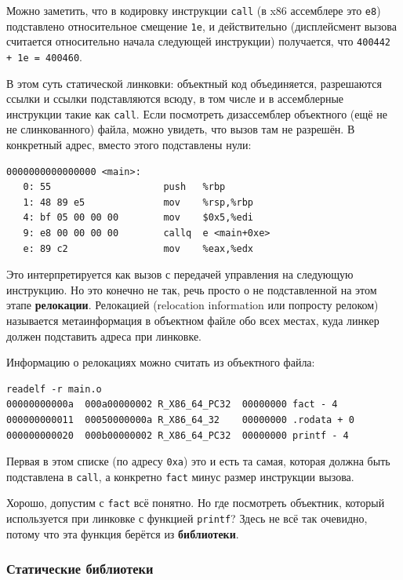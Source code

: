 \documentclass[a4paper,12pt,oneside]{article}
\begin{document}
Можно заметить, что в кодировку инструкции \lstinline!сall! (в x86 ассемблере это \lstinline!e8!) подставлено относительное смещение \lstinline!1e!, и действительно (дисплейсмент вызова считается относительно начала следующей инструкции) получается, что \lstinline!400442 + 1e = 400460!.

В этом суть статической линковки: объектный код объединяется, разрешаются ссылки и ссылки подставляются всюду, в том числе и в ассемблерные инструкции такие как \lstinline!call!. Если посмотреть дизассемблер объектного (ещё не не слинкованного) файла, можно увидеть, что вызов там не разрешён. В конкретный адрес, вместо этого подставлены нули:

\begin{verbatim}
0000000000000000 <main>:
   0: 55                    push   %rbp
   1: 48 89 e5              mov    %rsp,%rbp
   4: bf 05 00 00 00        mov    $0x5,%edi
   9: e8 00 00 00 00        callq  e <main+0xe>
   e: 89 c2                 mov    %eax,%edx
\end{verbatim}

Это интерпретируется как вызов с передачей управления на следующую инструкцию. Но это конечно не так, речь просто о не подставленной на этом этапе \textbf{релокации}. Релокацией (relocation information или попросту релоком) называется метаинформация в объектном файле обо всех местах, куда линкер должен подставить адреса при линковке.

Информацию о релокациях можно считать из объектного файла:

\begin{verbatim}
readelf -r main.o
00000000000a  000a00000002 R_X86_64_PC32  00000000 fact - 4
000000000011  00050000000a R_X86_64_32    00000000 .rodata + 0
000000000020  000b00000002 R_X86_64_PC32  00000000 printf - 4
\end{verbatim}

Первая в этом списке (по адресу \lstinline!0xa!) это и есть та самая, которая должна быть подставлена в \lstinline!call!, а конкретно \lstinline!fact! минус размер инструкции вызова.

Хорошо, допустим с \lstinline!fact! всё понятно. Но где посмотреть объектник, который используется при линковке с функцией \lstinline!printf!? Здесь не всё так очевидно, потому что эта функция берётся из \textbf{библиотеки}.

\subsubsection{Статические библиотеки}\label{subsubsec:StaticLibs}
\end{document}

